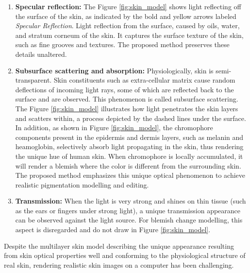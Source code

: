 \begin{spacing}{1.5}
\begin{enumerate}
    \item \textbf{Specular reflection:} The Figure \ref{fig:skin_model} shows light reflecting off the surface of the skin, as indicated by the bold and yellow arrows labeled \textit{Specular Reflection}. Light reflection from the surface, caused by oils, water, and stratum corneum of the skin. It captures the surface texture of the skin, such as fine grooves and textures. The proposed method preserves these details unaltered.
    \item \textbf{Subsurface scattering and absorption:} Physiologically, skin is semi-transparent\cite{Igarashi2005TheAO}. Skin constituents such as extra-cellular matrix cause random deflections of incoming light rays, some of which are reflected back to the surface and are observed. This phenomenon is called subsurface scattering. The Figure \ref{fig:skin_model} illustrates how light penetrates the skin layers and scatters within, a process depicted by the dashed lines under the surface. In addition, as shown in Figure \ref{fig:skin_model}, the chromophore components present in the epidermis and dermis layers, such as melanin and heamoglobin, selectively absorb light propagating in the skin, thus rendering the unique hue of human skin. When chromophore is locally accumulated, it will render a blemish where the color is different from the surrounding skin\cite{ANDERSON198113}. The proposed method emphasizes this unique optical phenomenon to achieve realistic pigmentation modelling and editing.
    \item \textbf{Transmission:} When the light is very strong and shines on thin tissue (such as the ears or fingers under strong light), a unique transmission appearance can be observed against the light source. For blemish change modelling, this aspect is disregarded and do not draw in Figure \ref{fig:skin_model}.
\end{enumerate}

Despite the multilayer skin model describing the unique appearance resulting from skin optical properties well and conforming to the physiological structure of real skin, rendering realistic skin images on a computer has been challenging. 


\end{spacing}
